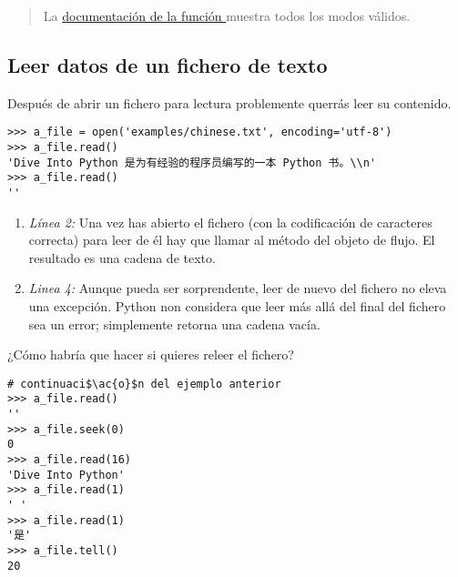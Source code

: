 \begin{quote}
La \href{http://docs.python.org/3.1/library/io.html#module-interface}{documentación de la función } muestra todos los modos válidos.
\end{quote}

\subsection{Leer datos de un fichero de texto}

Después de abrir un fichero para lectura problemente querrás leer su contenido.

\noindent\begin{minipage}{\textwidth}
\begin{lstlisting}[mathescape=True,escapeinside=@@]
>>> a_file = open('examples/chinese.txt', encoding='utf-8')
>>> a_file.read()
'Dive Into Python 是为有经验的程序员编写的一本 Python 书。\\n'
>>> a_file.read()
''
\end{lstlisting}
\end{minipage}

\begin{enumerate}

\item \emph{Línea 2:} Una vez has abierto el fichero (con la codificación de caracteres correcta) para leer de él hay que llamar al método  del objeto de flujo. El resultado es una cadena de texto.

\item \emph{Linea 4:} Aunque pueda ser sorprendente, leer de nuevo del fichero no eleva una excepción. Python non considera que leer más allá del final del fichero sea un error; simplemente retorna una cadena vacía.

\end{enumerate}


¿Cómo habría que hacer si quieres releer el fichero?

\noindent\begin{minipage}{\textwidth}
\begin{lstlisting}[mathescape=True,escapeinside=@@]
# continuaci$\ac{o}$n del ejemplo anterior
>>> a_file.read()
''
>>> a_file.seek(0)
0
>>> a_file.read(16)
'Dive Into Python'
>>> a_file.read(1)
' '
>>> a_file.read(1)
'是'
>>> a_file.tell()
20
\end{lstlisting}
\end{minipage}

